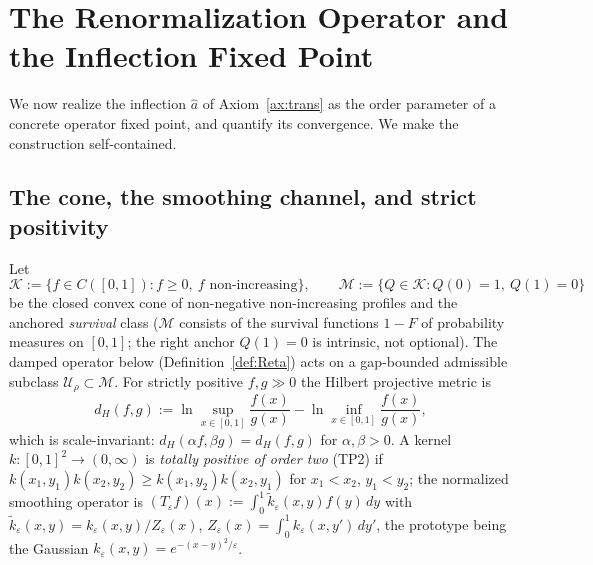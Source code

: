 \documentclass[11pt]{article}
\theoremstyle{plain}
\theoremstyle{definition}
\theoremstyle{remark}
\begin{document}
\section{The Renormalization Operator and the Inflection Fixed Point}\label{sec:operator}

We now realize the inflection $\hat a$ of Axiom~\ref{ax:trans} as the order parameter of a concrete operator fixed point, and quantify its convergence. We make the construction self-contained.

\subsection{The cone, the smoothing channel, and strict positivity}

Let
\[
\mathcal K:=\{f\in C([0,1]):f\ge0,\ f\text{ non-increasing}\},\qquad
\mathcal M:=\{Q\in\mathcal K:Q(0)=1,\ Q(1)=0\}
\]
be the closed convex cone of non-negative non-increasing profiles and the anchored \emph{survival} class ($\mathcal M$ consists of the survival functions $1-F$ of probability measures on $[0,1]$; the right anchor $Q(1)=0$ is intrinsic, not optional). The damped operator below (Definition~\ref{def:Reta}) acts on a gap-bounded admissible subclass $\mathcal U_\rho\subset\mathcal M$. For strictly positive $f,g\gg0$ the Hilbert projective metric is
\[
d_H(f,g):=\ln\sup_{x\in[0,1]}\frac{f(x)}{g(x)}-\ln\inf_{x\in[0,1]}\frac{f(x)}{g(x)},
\]
which is scale-invariant: $d_H(\alpha f,\beta g)=d_H(f,g)$ for $\alpha,\beta>0$. A kernel $k:[0,1]^2\to(0,\infty)$ is \emph{totally positive of order two} (TP2) if $k(x_1,y_1)k(x_2,y_2)\ge k(x_1,y_2)k(x_2,y_1)$ for $x_1<x_2$, $y_1<y_2$; the normalized smoothing operator is $(T_\varepsilon f)(x):=\int_0^1\tilde k_\varepsilon(x,y)f(y)\,dy$ with $\tilde k_\varepsilon(x,y)=k_\varepsilon(x,y)/Z_\varepsilon(x)$, $Z_\varepsilon(x)=\int_0^1 k_\varepsilon(x,y')\,dy'$, the prototype being the Gaussian $k_\varepsilon(x,y)=e^{-(x-y)^2/\varepsilon}$.
\end{document}
